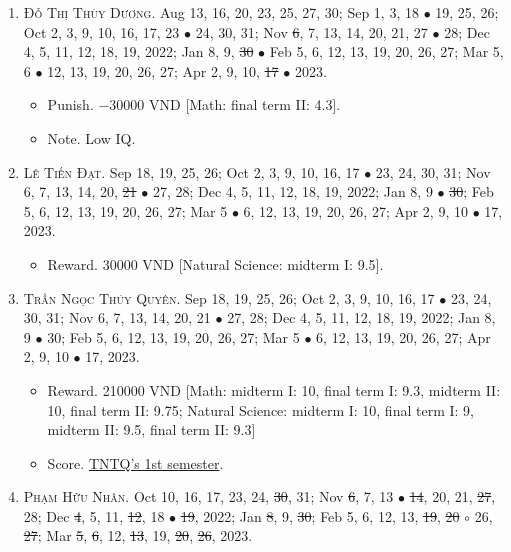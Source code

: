 \documentclass{article}
\begin{document}
\begin{enumerate}
	\item \textsc{Đỗ Thị Thùy Dương.} {\sf[In]} Aug 13, 16, 20, 23, 25, 27, 30; Sep 1, 3, 18 $\bullet$ 19, 25, 26; Oct 2, 3, 9, 10, 16, 17, 23 $\bullet$ 24, 30, 31; Nov \st{6}, 7, 13, 14, 20, 21, 27 $\bullet$ 28; Dec 4, 5, 11, 12, 18, 19, 2022; Jan 8, 9, \st{30} $\bullet$ Feb 5, 6, 12, 13, 19, 20, 26, 27; Mar 5, 6 $\bullet$ 12, 13, 19, 20, 26, 27; Apr 2, 9, 10, \st{17} $\bullet$ 2023. {\sf[Out]}
	\begin{itemize}
		\item {\sf Punish.} $-30000$ VND [Math: final term II: 4.3].
		\item {\sf Note.} Low IQ.
	\end{itemize}	
	\item \textsc{Lê Tiến Đạt.} {\sf[In]} Sep 18, 19, 25, 26; Oct 2, 3, 9, 10, 16, 17 $\bullet$ 23, 24, 30, 31; Nov 6, 7, 13, 14, 20, \st{21} $\bullet$ 27, 28; Dec 4, 5, 11, 12, 18, 19, 2022; Jan 8, 9 $\bullet$ \st{30}; Feb 5, 6, 12, 13, 19, 20, 26, 27; Mar 5 $\bullet$ 6, 12, 13, 19, 20, 26, 27; Apr 2, 9, 10 $\bullet$ 17, 2023.
	\begin{itemize}
		\item {\sf Reward.} 30000 VND [Natural Science: midterm I: 9.5].
	\end{itemize}
	\item \textsc{Trần Ngọc Thúy Quyên.} {\sf[In]} Sep 18, 19, 25, 26; Oct 2, 3, 9, 10, 16, 17 $\bullet$ 23, 24, 30, 31; Nov 6, 7, 13, 14, 20, 21 $\bullet$ 27, 28; Dec 4, 5, 11, 12, 18, 19, 2022; Jan 8, 9 $\bullet$ 30; Feb 5, 6, 12, 13, 19, 20, 26, 27; Mar 5 $\bullet$ 6, 12, 13, 19, 20, 26, 27; Apr 2, 9, 10 $\bullet$ 17, 2023.
	\begin{itemize}
		\item {\sf Reward.} 210000 VND [Math: midterm I: 10, final term I: 9.3, midterm II: 10, final term II: 9.75; Natural Science: midterm I: 10, final term I: 9, midterm II: 9.5, final term II: 9.3]
		\item {\sf Score.} \href{https://github.com/NQBH/hobby/blob/master/STEM/student/Tran_Ngoc_Thuy_Quyen_grade_7_1st_semester.jpg}{TNTQ's 1st semester}.
	\end{itemize}
	\item \textsc{Phạm Hữu Nhân.} {\sf[In]} Oct 10, 16, 17, 23, 24, \st{30}, 31; Nov \st{6}, 7, 13 $\bullet$ \st{14}, 20, 21, \st{27}, 28; Dec \st{4}, 5, 11, \st{12}, 18 $\bullet$ \st{19}, 2022; Jan \st{8}, 9, \st{30}; Feb 5, 6, 12, 13, \st{19}, \st{20} $\circ$ 26, \st{27}; Mar \st{5}, \st{6}, 12, \st{13}, 19, \st{20}, \st{26}, 2023. {}

\end{enumerate}
\end{document}
